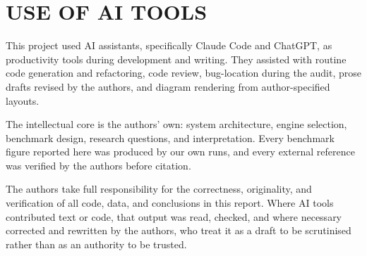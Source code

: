 \chapter*{USE OF AI TOOLS}


This project used AI assistants, specifically Claude Code and ChatGPT, as
productivity tools during development and writing. They assisted with routine
code generation and refactoring, code review, bug-location during the audit,
prose drafts revised by the authors, and diagram rendering from author-specified
layouts.

The intellectual core is the authors' own: system architecture, engine
selection, benchmark design, research questions, and interpretation. Every
benchmark figure reported here was produced by our own runs, and every external
reference was verified by the authors before citation.

The authors take full responsibility for the correctness, originality, and
verification of all code, data, and conclusions in this report. Where AI tools
contributed text or code, that output was read, checked, and where necessary
corrected and rewritten by the authors, who treat it as a draft to be
scrutinised rather than as an authority to be trusted.
